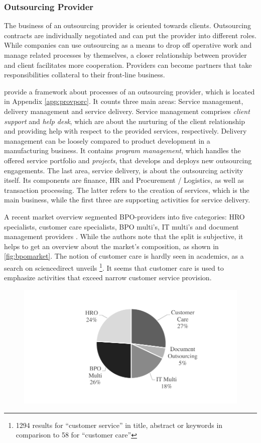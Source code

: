		\subsubsection{Outsourcing Provider}
		
		The business of an outsourcing provider is oriented towards clients. Outsourcing contracts are individually negotiated and can put the provider into different roles. While companies can use outsourcing as a means to drop off operative work and manage related processes by themselves, a closer relationship between provider and client facilitates more cooperation. Providers can become partners that take responsibilities collateral to their front-line business. 
		
		\citeauthor{schewe2007} provide a framework about processes of an outsourcing provider, which is located in Appendix \ref{app:provporc}. It counts three main areas: Service management, delivery management and service delivery. Service management comprises \textit{client support} and \textit{help desk}, which are about the nurturing of the client relationship and providing help with respect to the provided services, respectively. Delivery management can be loosely compared to product development in a manufacturing business. It contains \textit{program management}, which handles the offered service portfolio and \textit{projects}, that develops and deploys new outsourcing engagements. The last area, service delivery, is about the outsourcing activity itself. Its components are finance, HR and Procurement / Logistics, as well as transaction processing. The latter refers to the creation of services, which is the main business, while the first three are supporting activities for service delivery. 
			
		A recent market overview segmented BPO-providers into five categories: \acrfull{HRO} specialists, customer care specialists, BPO multi's, IT multi's and document management providers \cite{hfs2016top}.  While the authors note that the split is subjective, it helps to get an overview about the market's composition, as shown in \Fig \ref{fig:bpomarket}. The notion of customer care is hardly seen in academics, as a search on sciencedirect unveils \footnote{1294 results for \enquote{customer service} in title, abstract or keywords in comparison to 58 for \enquote{customer care}}. It seems that customer care is used to emphasize activities that exceed narrow customer service provision. 		
			
		\begin{figure}[caption={BPO market composition}, label={fig:bpomarket}]
			{	\includegraphics[width=.8\textwidth]{figures/bpomarket.pdf}}
		\end{figure}
	
